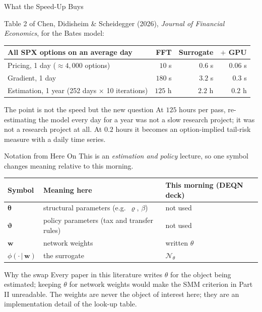 \documentclass[aspectratio=169,11pt]{beamer}
\newcommand{\emphc}[1]{\textcolor{harvardcrimson}{#1}}
\newcommand{\str}{\bm{\theta}}          %
\newcommand{\pol}{\bm{\vartheta}}       %
\newcommand{\netw}{\bm{w}}              %
\newcommand{\surr}{\phi}                %
\begin{document}
\begin{frame}{What the Speed-Up Buys}
\begin{center}
{\footnotesize Table 2 of Chen, Didisheim \& Scheidegger (2026), \emph{Journal of Financial Economics}, for the Bates model:}

\vspace{0.2cm}
\small
\begin{tabular}{l r r r}
\toprule
\textbf{All SPX options on an average day} & \textbf{FFT} & \textbf{Surrogate} & \textbf{$+$ GPU} \\
\midrule
Pricing, 1 day (${\approx}4{,}000$ options) & $10$ s & $0.6$ s & $0.06$ s \\
Gradient, 1 day & $180$ s & $3.2$ s & $0.3$ s \\
Estimation, 1 year (252 days $\times$ 10 iterations) & $125$ h & $2.2$ h & \emphc{$0.2$} h \\
\bottomrule
\end{tabular}
\end{center}

\vspace{0.3cm}
\begin{alertblock}{The point is not the speed but the new question}
At $125$ hours per pass, re-estimating the model every day for a year was not a slow research project; it was \emphc{not a research project at all}. At $0.2$ hours it becomes an option-implied tail-risk measure with a daily time series.
\end{alertblock}
\end{frame}

\begin{frame}{Notation from Here On}
This is an \emph{estimation and policy} lecture, so one symbol changes meaning relative to this morning.

\vspace{0.2cm}
\begin{center}
\small
\begin{tabular}{l l l}
\toprule
\textbf{Symbol} & \textbf{Meaning here} & \textbf{This morning (DEQN deck)} \\
\midrule
$\str$ & \emphc{structural} parameters (e.g.\ $\varrho$, $\beta$) & not used \\
$\pol$ & \emphc{policy} parameters (tax and transfer rules) & not used \\
$\netw$ & network weights & written $\theta$ \\
$\surr(\cdot\,|\,\netw)$ & the surrogate & $\mathcal{N}_\theta$ \\
\bottomrule
\end{tabular}
\end{center}

\vspace{0.25cm}
\begin{alertblock}{Why the swap}
Every paper in this literature writes $\theta$ for the object being estimated; keeping $\theta$ for network weights would make the SMM criterion in Part II unreadable. \emphc{The weights are never the object of interest here}; they are an implementation detail of the look-up table.
\end{alertblock}
\end{frame}
\end{document}
